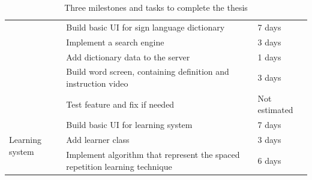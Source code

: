 \begin{table}[H]
\begin{tabular}{ |p{4cm}|p{8cm}|l| }
		                                                            & Build basic UI for sign language dictionary                                 & 7 days         \\ \cline{2-3} 
		                                                            & Implement a search engine                                                   & 3 days         \\ \cline{2-3} 
		                                                            & Add dictionary data to the server                                           & 1 days         \\ \cline{2-3} 
		                                                            & Build word screen, containing definition and instruction video              & 3 days         \\ \cline{2-3} 
		                                                            & Test feature and fix if needed                                              & Not estimated  \\ \hline
		\multirow{3}{4cm}{Learning system}                          & Build basic UI for learning system                                          & 7 days         \\ \cline{2-3} 
		                                                            & Add learner class                                                           & 3 days         \\ \cline{2-3} 
		                                                            & Implement algorithm that represent the spaced repetition learning technique & 6 days         \\ \hline
	\end{tabular}
	\caption{Three milestones and tasks to complete the thesis}
  \label{tab:Chap5-upcomingPlan}
\end{table}






